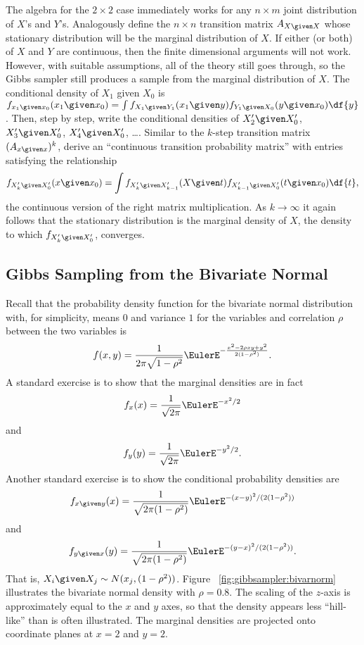 \documentclass[12pt]{article}
\begin{document}
The algebra for the \( 2 \times 2 \) case immediately works for any \( n
\times m \) joint distribution of \( X \)'s and \( Y \)'s.  Analogously
define the \( n \times n \) transition matrix \( A_{X \given X} \) whose
stationary distribution will be the marginal distribution of \( X \). If
either (or both) of \( X \) and \( Y \) are continuous, then the finite
dimensional arguments will not work.  However, with suitable
assumptions, all of the theory still goes through, so the Gibbs sampler
still produces a sample from the marginal distribution of \( X \).  The
conditional density of \( X_1 \) given \( X_0 \) is \( f_{x_1 \given x_0}
(x_1 \given x_0) = \int f_{X_1 \given Y_1}(x_1 \given y)f_{Y_1 \given X_0}
(y \given x_0) \df{y} \).  Then, step by step, write the conditional
densities of \( X'_2 \given X'_0 \), \( X'_3 \given X'_0 \), \( X'_4
\given X'_0 \), \dots.  Similar to the \( k \)-step transition matrix \(
(A_{x \given x})^k \), derive an ``continuous transition probability
matrix'' with entries satisfying the relationship
\[
    f_{X'_k \given X'_0}(x \given x_0 ) = \int f_{X'_k \given X'_{k-1}}
    (X \given t) f_{X'_{k-1} \given X'_{0}}(t \given x_0) \df{t},
\] the continuous version of the right matrix multiplication.  As \( k
\to \infty \) it again follows that the stationary distribution is the
marginal density of \( X \), the density to which \( f_{X'_k \given X'_0}
\), converges.

\subsection*{Gibbs Sampling from the Bivariate Normal}

Recall that the probability density function for the bivariate normal
distribution%
with, for simplicity, means \( 0 \) and variance \( 1 \) for the
variables and correlation \( \rho \) between the two variables is
\[
    f(x, y) = \frac{1}{2\pi \sqrt{1 - \rho^2}} \EulerE^{- \frac{x^2 - 2
    \rho x y + y^2}{2(1-\rho^2)}}.
\] A standard exercise is to show that the marginal densities%
are in fact
\[
    f_{x}(x) = \frac{1}{\sqrt{2\pi}} \EulerE^{-x^2/2}
\] and
\[
    f_{y}(y) = \frac{1}{\sqrt{2\pi}} \EulerE^{-y^2/2}.
\] Another standard exercise is to show the conditional probability
densities are
\[
    f_{x \given y}(x) = \frac{1}{\sqrt{2\pi (1-\rho^2)}} \EulerE^{-(x-y)^2/
    (2(1-\rho^2))}
\] and
\[
    f_{y \given x}(y) = \frac{1}{\sqrt{2\pi (1-\rho^2)}} \EulerE^{-(y-x)^2/
    (2(1-\rho^2))}.
\] That is, \( X_i \given X_j \sim N(x_j, (1-\rho^2)) \). Figure~%
\ref{fig:gibbsampler:bivarnorm} illustrates the bivariate normal
density with \( \rho = 0.8 \).  The scaling of the \( z \)-axis is
approximately equal to the \( x \) and \( y \) axes, so that the density
appears less ``hill-like'' than is often illustrated.  The marginal
densities are projected onto coordinate planes at \( x = 2 \) and \( y =
2 \).
\end{document}
